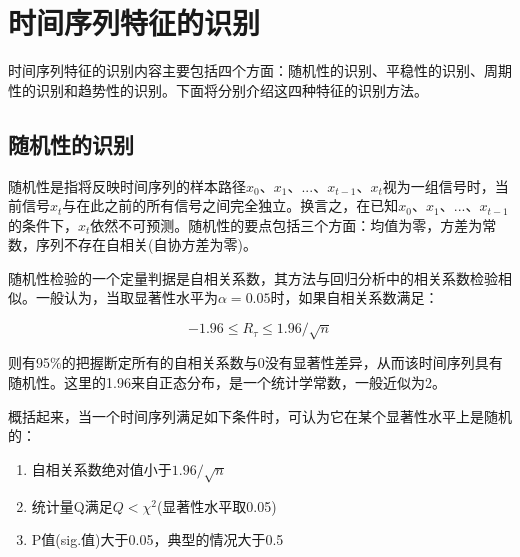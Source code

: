



\section{时间序列特征的识别}

时间序列特征的识别内容主要包括四个方面：随机性的识别、平稳性的识别、周期性的识别和趋势性的识别。下面将分别介绍这四种特征的识别方法。

\subsection{随机性的识别}
随机性是指将反映时间序列的样本路径$x_0、x_1、...、x_{t-1}、x_t$视为一组信号时，当前信号$x_t$与在此之前的所有信号之间完全独立。换言之，在已知$x_0、x_1、...、x_{t-1}$的条件下，$x_t$依然不可预测。随机性的要点包括三个方面：均值为零，方差为常数，序列不存在自相关(自协方差为零)。

随机性检验的一个定量判据是自相关系数，其方法与回归分析中的相关系数检验相似。一般认为，当取显著性水平为$\alpha=0.05$时，如果自相关系数满足：

\[-1.96 \leq R_\tau \leq 1.96/\sqrt{n}\]

则有95\%的把握断定所有的自相关系数与0没有显著性差异，从而该时间序列具有随机性。这里的1.96来自正态分布，是一个统计学常数，一般近似为2。

概括起来，当一个时间序列满足如下条件时，可认为它在某个显著性水平上是随机的：
\begin{enumerate}
    \item 自相关系数绝对值小于$1.96/\sqrt{n}$
    \item 统计量Q满足$Q < \chi^2$(显著性水平取0.05)
    \item P值(sig.值)大于0.05，典型的情况大于0.5
\end{enumerate}


